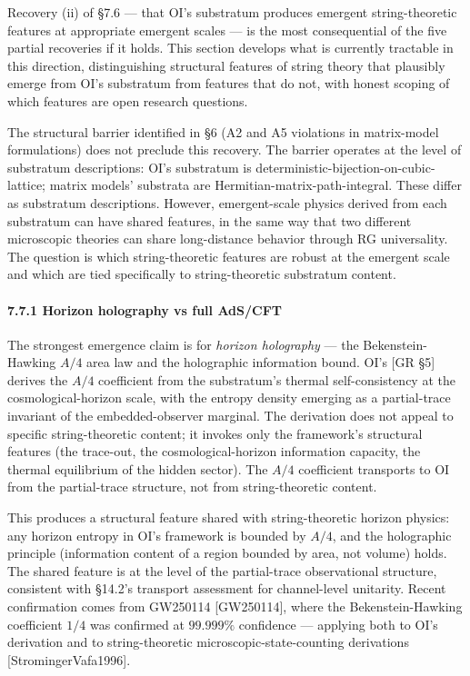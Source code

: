 \documentclass[
]{article}
\begin{document}
Recovery (ii) of §7.6 --- that OI's substratum produces emergent
string-theoretic features at appropriate emergent scales --- is the most
consequential of the five partial recoveries if it holds. This section
develops what is currently tractable in this direction, distinguishing
structural features of string theory that plausibly emerge from OI's
substratum from features that do not, with honest scoping of which
features are open research questions.

The structural barrier identified in §6 (A2 and A5 violations in
matrix-model formulations) does not preclude this recovery. The barrier
operates at the level of substratum descriptions: OI's substratum is
deterministic-bijection-on-cubic-lattice; matrix models' substrata are
Hermitian-matrix-path-integral. These differ as substratum descriptions.
However, emergent-scale physics derived from each substratum can have
shared features, in the same way that two different microscopic theories
can share long-distance behavior through RG universality. The question
is which string-theoretic features are robust at the emergent scale and
which are tied specifically to string-theoretic substratum content.

\hypertarget{horizon-holography-vs-full-adscft}{%
\paragraph{7.7.1 Horizon holography vs full
AdS/CFT}\label{horizon-holography-vs-full-adscft}}

The strongest emergence claim is for \emph{horizon holography} --- the
Bekenstein-Hawking \(A/4\) area law and the holographic information
bound. OI's {[}GR §5{]} derives the \(A/4\) coefficient from the
substratum's thermal self-consistency at the cosmological-horizon scale,
with the entropy density emerging as a partial-trace invariant of the
embedded-observer marginal. The derivation does not appeal to specific
string-theoretic content; it invokes only the framework's structural
features (the trace-out, the cosmological-horizon information capacity,
the thermal equilibrium of the hidden sector). The \(A/4\) coefficient
transports to OI from the partial-trace structure, not from
string-theoretic content.

This produces a structural feature shared with string-theoretic horizon
physics: any horizon entropy in OI's framework is bounded by \(A/4\),
and the holographic principle (information content of a region bounded
by area, not volume) holds. The shared feature is at the level of the
partial-trace observational structure, consistent with §14.2's transport
assessment for channel-level unitarity. Recent confirmation comes from
GW250114 {[}GW250114{]}, where the Bekenstein-Hawking coefficient
\(1/4\) was confirmed at \(99.999\%\) confidence --- applying both to
OI's derivation and to string-theoretic microscopic-state-counting
derivations {[}StromingerVafa1996{]}.
\end{document}

